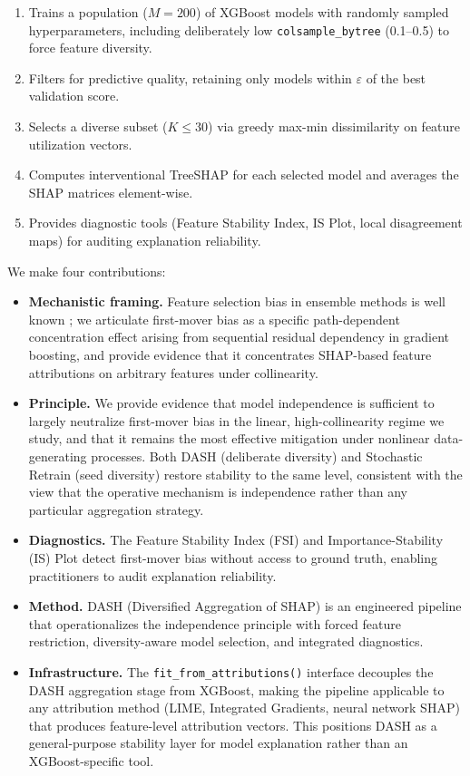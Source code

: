\documentclass[11pt]{article}
\newcommand{\dash}{\textsc{DASH}}
\begin{document}
\begin{enumerate}
  \item Trains a population ($M = 200$) of XGBoost models with
    randomly sampled hyperparameters, including deliberately low
    \texttt{colsample\_bytree} (0.1--0.5) to force feature diversity.
  \item Filters for predictive quality, retaining only models within
    $\varepsilon$ of the best validation score.
  \item Selects a diverse subset ($K \leq 30$) via greedy max-min
    dissimilarity on feature utilization vectors.
  \item Computes interventional TreeSHAP for each selected model and
    averages the SHAP matrices element-wise.
  \item Provides diagnostic tools (Feature Stability Index, IS Plot,
    local disagreement maps) for auditing explanation reliability.
\end{enumerate}

We make four contributions:
\begin{itemize}
  \item \textbf{Mechanistic framing.} Feature selection bias in ensemble methods
    is well known \citep{strobl2007bias, hooker2019please}; we articulate
    first-mover bias as a specific path-dependent concentration effect
    arising from sequential residual dependency in gradient
    boosting, and provide evidence that it concentrates SHAP-based feature
    attributions on arbitrary features under collinearity.
  \item \textbf{Principle.} We provide evidence that model independence is
    sufficient to largely neutralize first-mover bias in the linear,
    high-collinearity regime we study, and that it remains the most
    effective mitigation under nonlinear data-generating processes.  Both \dash{} (deliberate diversity) and
    Stochastic Retrain (seed diversity) restore stability to the same
    level, consistent with the view that the operative mechanism is independence
    rather than any particular aggregation strategy.
  \item \textbf{Diagnostics.} The Feature Stability Index (FSI) and
    Importance-Stability (IS) Plot detect first-mover bias without
    access to ground truth, enabling practitioners to audit explanation
    reliability.
  \item \textbf{Method.} \dash{} (Diversified Aggregation of SHAP) is
    an engineered pipeline that operationalizes the independence principle
    with forced feature restriction, diversity-aware model selection,
    and integrated diagnostics.
  \item \textbf{Infrastructure.} The \texttt{fit\_from\_attributions()}
    interface decouples the DASH aggregation stage from XGBoost, making
    the pipeline applicable to any attribution method (LIME, Integrated
    Gradients, neural network SHAP) that produces feature-level
    attribution vectors.  This positions \dash{} as a general-purpose
    stability layer for model explanation rather than an XGBoost-specific tool.
\end{itemize}
\end{document}
